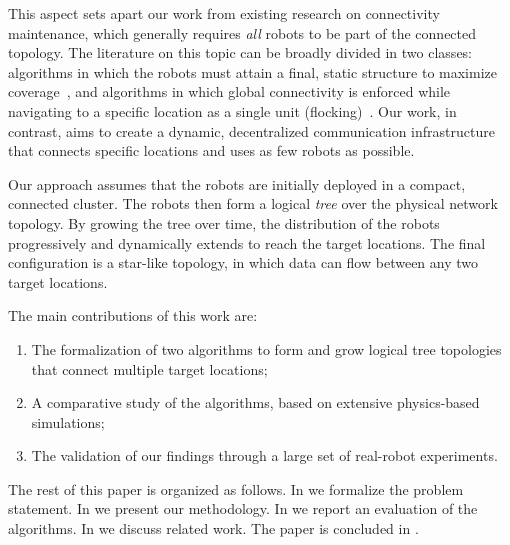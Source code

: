 This aspect sets apart our work from existing research on connectivity
maintenance, which generally requires \emph{all} robots to be part of
the connected topology. The literature on this topic can be broadly
divided in two classes: algorithms in which the robots must attain a
final, static structure to maximize coverage~\cite{Aragues2014}, and
algorithms in which global connectivity is enforced while navigating
to a specific location as a single unit
(flocking)~\cite{Nestmeyer2017}. Our work, in contrast, aims to create
a dynamic, decentralized communication infrastructure that connects
specific locations and uses as few robots as possible.

Our approach assumes that the robots are initially deployed in a
compact, connected cluster. The robots then form a logical \emph{tree}
over the physical network topology. By growing the tree over time, the
distribution of the robots progressively and dynamically extends to
reach the target locations. The final configuration is a star-like
topology, in which data can flow between any two target
locations.

The main contributions of this work are:
\begin{enumerate}
\item The formalization of two algorithms to form and grow logical
  tree topologies that connect multiple target locations;
\item A comparative study of the algorithms, based on extensive
  physics-based simulations;
\item The validation of our findings through a large set of real-robot
  experiments.
\end{enumerate}

The rest of this paper is organized as follows. In  we
formalize the problem statement. In  we present our
methodology. In  we report an evaluation of the
algorithms. In  we discuss related work. The paper
is concluded in .

